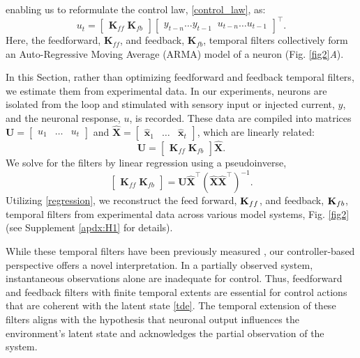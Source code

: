 \documentclass[9pt,twocolumn,twoside]{pnas-new}
\begin{document}
enabling us to reformulate the control law, \eqref{control_law}, as:
\begin{equation}
{u}_t = \begin{bmatrix} \mathbf{K}_{ff} \; \mathbf{K}_{fb} \end{bmatrix} \begin{bmatrix} 
{y}_{t-n} \hdots {y}_{t-1}\;\;{u}_{t-n} \hdots {u}_{t-1} \end{bmatrix}^\top.
\end{equation}
Here, the feedforward, $\mathbf{K}_{ff}$, and feedback, $\mathbf{K}_{fb}$, temporal filters collectively form an Auto-Regressive Moving Average (ARMA) model of a neuron (Fig. \ref{fig2}\textit{A}).

In this Section, rather than optimizing feedforward and feedback temporal filters, we estimate them from experimental data. In our experiments, neurons are isolated from the loop and stimulated with sensory input or injected current, $y$, and the neuronal response, $u$, is recorded. These data are compiled into matrices $\mathbf{U}=\begin{bmatrix} {u}_1  & \hdots & {u}_t \end{bmatrix}$ and $\mathbf{\hat{X}} = \begin{bmatrix} \mathbf{\hat{x}}_1  & \hdots & \mathbf{\hat{x}}_t \end{bmatrix}$, which are linearly related:
\begin{equation}
\mathbf{U} = \begin{bmatrix} \mathbf{K}_{ff} \; \mathbf{K}_{fb} \end{bmatrix} \mathbf{\hat{X}}.
\end{equation}
We solve for the filters by linear regression using a pseudoinverse, 
\begin{equation}
\label{regression}
\begin{bmatrix} \mathbf{K}_{ff} \; \mathbf{K}_{fb} \end{bmatrix} = \mathbf{U} \mathbf{\hat{X}}^\top \left(\mathbf{\hat{X}} \mathbf{\hat{X}}^\top\right)^{-1}.
\end{equation}
Utilizing \eqref{regression}, we reconstruct the feed forward, ${\bf K}_{ff}$, and feedback, ${\bf K}_{fb}$, temporal filters from experimental data across various model systems, Fig. \ref{fig2} (see Supplement \ref{apdx:H1} for details). 

While these temporal filters have been previously measured \citep{rieke1999spikes,keat2001predicting,pillow2008spatio}, our controller-based perspective offers a novel interpretation. In a partially observed system, instantaneous observations alone are inadequate for control. Thus, feedforward and feedback filters with finite temporal extents are essential for control actions that are coherent with the latent state \eqref{tde}. The temporal extension of these filters aligns with the hypothesis that neuronal output influences the environment's latent state and acknowledges the partial observation of the system.
\end{document}
